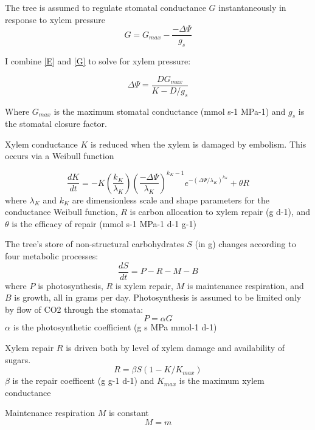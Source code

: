 \documentclass[12pt]{amsart}
\begin{document}
The tree is assumed to regulate stomatal conductance $G$ instantaneously in response to xylem pressure
\begin{equation}\label{G}
G = G_{max} - \frac{-\Delta\Psi}{g_s}
\end{equation}

I combine \eqref{E} and \eqref{G} to solve for xylem pressure:

\begin{equation}\label{DPsi}
\Delta\Psi = \frac{DG_{max}}{K - D/g_s}
\end{equation}

Where $G_{max}$ is the maximum stomatal conductance (mmol s-1 MPa-1) and $g_s$ is the stomatal closure factor.

Xylem conductance $K$ is reduced when the xylem is damaged by embolism.  This occurs via a Weibull function

\begin{equation}\label{dK}
\frac{dK}{dt} = -K(\frac{k_K}{\lambda_K})(\frac{-\Delta\Psi}{\lambda_K})^{k_K-1}e^{-(\Delta\Psi/\lambda_K)^{k_K}} + \theta R
\end{equation}
where $\lambda_K$ and $k_K$ are dimensionless scale and shape parameters for the conductance Weibull function, $R$ is carbon allocation to xylem repair (g d-1), and $\theta$ is the efficacy of repair (mmol s-1 MPa-1 d-1 g-1)

The tree's store of non-structural carbohydrates $S$ (in g) changes according to four metabolic processes:
\begin{equation}\label{dS}
\frac{dS}{dt} = P - R - M - B
\end{equation}
where $P$ is photosynthesis, $R$ is xylem repair, $M$ is maintenance respiration, and $B$ is growth, all in grams per day.  Photosynthesis is assumed to be limited only by flow of CO2 through the stomata:
\begin{equation}\label{P}
P = \alpha G
\end{equation}
$\alpha$ is the photosynthetic coefficient (g s MPa mmol-1 d-1)

Xylem repair $R$ is driven both by level of xylem damage and availability of sugars.
\begin{equation}\label{R}
R = \beta S (1 - K/K_{max})
 \end{equation}
 $\beta$ is the repair coefficent (g g-1 d-1) and $K_{max}$ is the maximum xylem conductance

Maintenance respiration $M$ is constant
\begin{equation}\label{M}
M = m
\end{equation}
 
\end{document}
